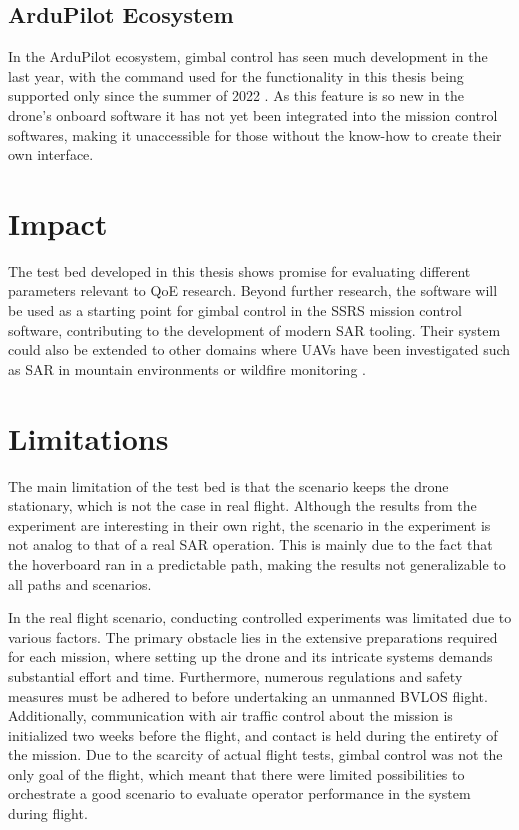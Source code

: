 \documentclass[nofilelist]{cslthse-msc}
\begin{document}
\subsection{ArduPilot Ecosystem}
In the ArduPilot ecosystem, gimbal control has seen much development in the last year, with the command used for the functionality in this thesis being supported only since the summer of 2022 \cite{ardupilot-gimbal-issue}. As this feature is so new in the drone's onboard software it has not yet been integrated into the mission control softwares, making it unaccessible for those without the know-how to create their own interface.

\section{Impact}
The test bed developed in this thesis shows promise for evaluating different parameters relevant to QoE research. Beyond further research, the software will be used as a starting point for gimbal control in the SSRS mission control software, contributing to the development of modern SAR tooling. Their system could also be extended to other domains where UAVs have been investigated such as SAR in mountain environments \cite{drones-mountain-sar} or wildfire monitoring \cite{drones-wildfire}.

\section{Limitations}
The main limitation of the test bed is that the scenario keeps the drone stationary, which is not the case in real flight. Although the results from the experiment are interesting in their own right, the scenario in the experiment is not analog to that of a real SAR operation. This is mainly due to the fact that the hoverboard ran in a predictable path, making the results not generalizable to all paths and scenarios.

In the real flight scenario, conducting controlled experiments was limitated due to various factors. The primary obstacle lies in the extensive preparations required for each mission, where setting up the drone and its intricate systems demands substantial effort and time. Furthermore, numerous regulations and safety measures must be adhered to before undertaking an unmanned BVLOS flight. Additionally, communication with air traffic control about the mission is initialized two weeks before the flight, and contact is held during the entirety of the mission. Due to the scarcity of actual flight tests, gimbal control was not the only goal of the flight, which meant that there were limited possibilities to orchestrate a good scenario to evaluate operator performance in the system during flight. 
\end{document}
